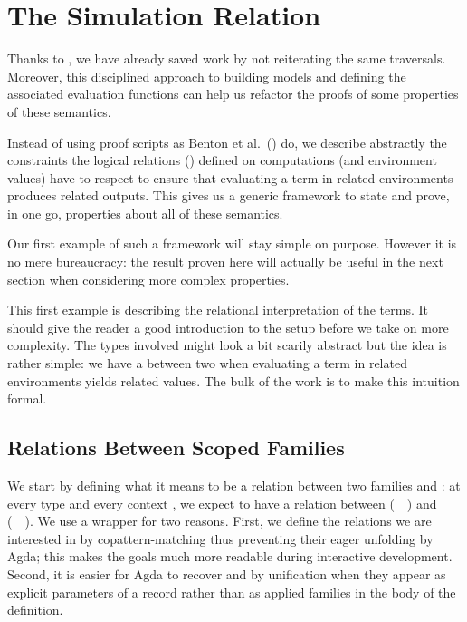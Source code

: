 \chapter{The Simulation Relation}
\label{sec:simulationrel}

Thanks to , we have already saved work by not reiterating the
same traversals. Moreover, this disciplined approach to building models and
defining the associated evaluation functions can help us refactor the proofs
of some properties of these semantics.

Instead of using proof scripts as Benton et al.~(\citeyear{benton2012strongly})
do, we describe abstractly the constraints the logical relations (\cite{reynolds1983types})
defined on computations (and environment values) have to respect to ensure
that evaluating a term in related environments
produces related outputs. This gives us a generic framework to
state and prove, in one go, properties about all of these semantics.

Our first example of such a framework will stay simple on purpose.
However it is no mere bureaucracy: the
result proven here will actually be useful in the next section
when considering more complex properties.

This first example is describing the relational interpretation of the terms.
It should give the reader a good introduction to the setup before we take on
more complexity. The types involved might look a bit scarily abstract but the
idea is rather simple: we have a  between two 
when evaluating a term in related environments yields related values. The bulk
of the work is to make this intuition formal.

\section{Relations Between Scoped Families}

We start by defining what it means to be a relation between two 
families  and : at every type  and every context , we
expect to have a relation between (~~) and (~~).
We use a  wrapper for two reasons. First, we define the relations we
are interested in by copattern-matching thus preventing their eager unfolding by
Agda; this makes the goals much more readable during interactive development.
Second, it is easier for Agda to recover  and  by unification when
they appear as explicit parameters of a record rather than as applied families
in the body of the definition.

